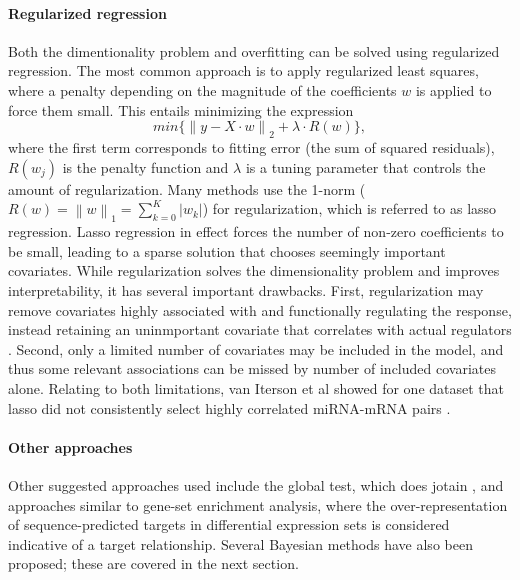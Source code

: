 \paragraph{Regularized regression}
Both the dimentionality problem and overfitting can be solved using regularized
regression. The most common approach is to apply regularized least squares,
where a penalty depending on the magnitude of the coefficients $w$
is applied to force them small. This entails minimizing the expression
\begin{equation}
	min\{ \left \| y - X \cdot w \right \|_2 + \lambda \cdot R(w) \} ,
\end{equation}
where the first term corresponds to fitting error (the sum of squared residuals),
$R(w_j)$ is the penalty function and $\lambda$ is a tuning
parameter that controls the amount of regularization. 
Many methods use the 1-norm ($R(w) = \left \| w \right \|_1 = \sum_{k=0}^{K} |w_k|$)
for regularization, which is referred to as lasso regression.
Lasso regression in effect forces the number of non-zero coefficients to be small,
leading to a sparse solution that chooses seemingly important covariates.
While regularization solves the dimensionality problem and improves
interpretability, it has several important drawbacks. First, regularization
may remove covariates highly associated with and functionally regulating the
response, instead retaining an uninmportant covariate that correlates with
actual regulators \citep{Engelmann2012}. Second, only a limited number of
covariates may be included in the model, and thus some relevant associations
can be missed by number of included covariates alone.%
Relating to both limitations, van Iterson et al showed for one dataset that
lasso did not consistently select highly correlated miRNA-mRNA pairs
\citep{vanIterson2013}.

\paragraph{Other approaches}
Other suggested approaches used include the global test, which does jotain
\citep{vanIterson2013}, and approaches similar to gene-set enrichment
analysis, where the over-representation of sequence-predicted targets in
differential expression sets is considered indicative of a target
relationship. Several Bayesian methods have also been proposed;
these are covered in the next section.


